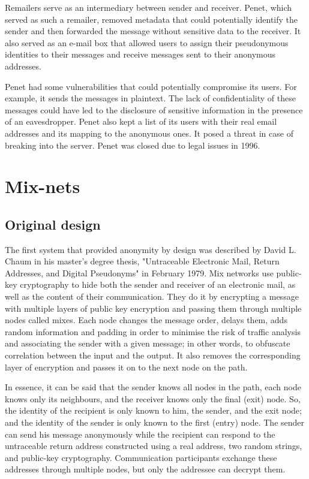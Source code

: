 Remailers serve as an intermediary between sender and receiver. Penet, which served as such a remailer, removed metadata that could potentially identify the sender and then forwarded the message without sensitive data to the receiver. It also served as an e-mail box that allowed users to assign their pseudonymous identities to their messages and receive messages sent to their anonymous addresses.

Penet had some vulnerabilities that could potentially compromise its users. For example, it sends the messages in plaintext. The lack of confidentiality of these messages could have led to the disclosure of sensitive information in the presence of an eavesdropper. Penet also kept a list of its users with their real email addresses and its mapping to the anonymous ones. It posed a threat in case of breaking into the server.
Penet was closed due to legal issues in 1996.

\section{Mix-nets}


\subsection{Original design}
The first system that provided anonymity by design was described by David L. Chaum in his master's degree thesis, "Untraceable Electronic Mail, Return Addresses, and Digital Pseudonyms" in February 1979. Mix networks use public-key cryptography to hide both the sender and receiver of an electronic mail, as well as the content of their communication. They do it by encrypting a message with multiple layers of public key encryption and passing them through multiple nodes called mixes. Each node changes the message order, delays them, adds random information and padding in order to minimise the risk of traffic analysis and associating the sender with a given message; in other words, to obfuscate correlation between the input and the output. It also removes the corresponding layer of encryption and passes it on to the next node on the path.

In essence, it can be said that the sender knows all nodes in the path, each node knows only its neighbours, and the receiver knows only the final (exit) node. So, the identity of the recipient is only known to him, the sender, and the exit node; and the identity of the sender is only known to the first (entry) node.
The sender can send his message anonymously while the recipient can respond to the untraceable return address constructed using a real address, two random strings, and public-key cryptography. Communication participants exchange these addresses through multiple nodes, but only the addressee can decrypt them.

